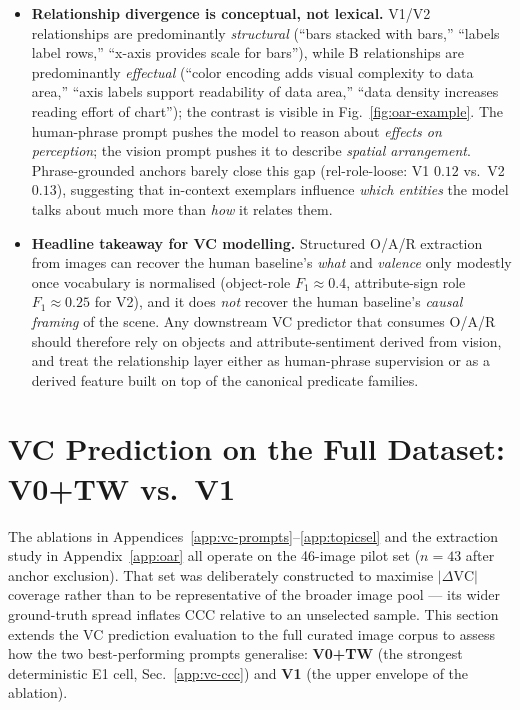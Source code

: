 \begin{itemize}
  \item \textbf{Relationship divergence is conceptual, not lexical.}
    V1/V2 relationships are predominantly \emph{structural}
    (``bars stacked with bars,'' ``labels label rows,'' ``x-axis
    provides scale for bars''), while B relationships are
    predominantly \emph{effectual} (``color encoding adds visual
    complexity to data area,'' ``axis labels support readability of
    data area,'' ``data density increases reading effort of
    chart''); the contrast is visible in
    Fig.~\ref{fig:oar-example}. The human-phrase prompt pushes the
    model to reason about \emph{effects on perception}; the vision
    prompt pushes it to describe \emph{spatial arrangement}.
    Phrase-grounded anchors barely close this gap
    (rel-role-loose: V1 $0.12$ vs.\ V2 $0.13$), suggesting that
    in-context exemplars influence \emph{which entities} the model
    talks about much more than \emph{how} it relates them.
  \item \textbf{Headline takeaway for VC modelling.} Structured
    O/A/R extraction from images can recover the human baseline's
    \emph{what} and \emph{valence} only modestly once vocabulary is
    normalised (object-role $F_1 \approx 0.4$, attribute-sign role
    $F_1 \approx 0.25$ for V2), and it does \emph{not} recover the
    human baseline's \emph{causal framing} of the scene. Any
    downstream VC predictor that consumes O/A/R should therefore
    rely on objects and attribute-sentiment derived from vision, and
    treat the relationship layer either as human-phrase supervision
    or as a derived feature built on top of the canonical predicate
    families.
\end{itemize}


\section{VC Prediction on the Full Dataset: V0+TW vs.\ V1}
\label{app:fullset}

The ablations in Appendices~\ref{app:vc-prompts}--\ref{app:topicsel}
and the extraction study in Appendix~\ref{app:oar} all operate on the
46-image pilot set ($n = 43$ after anchor exclusion). That set was
deliberately constructed to maximise $|\Delta\mathrm{VC}|$ coverage
rather than to be representative of the broader image pool --- its wider
ground-truth spread inflates CCC relative to an unselected sample.
This section extends the VC prediction evaluation to the full curated
image corpus to assess how the two best-performing prompts generalise:
\textbf{V0+TW} (the strongest deterministic E1 cell,
Sec.~\ref{app:vc-ccc}) and \textbf{V1} (the upper envelope of the
ablation).

